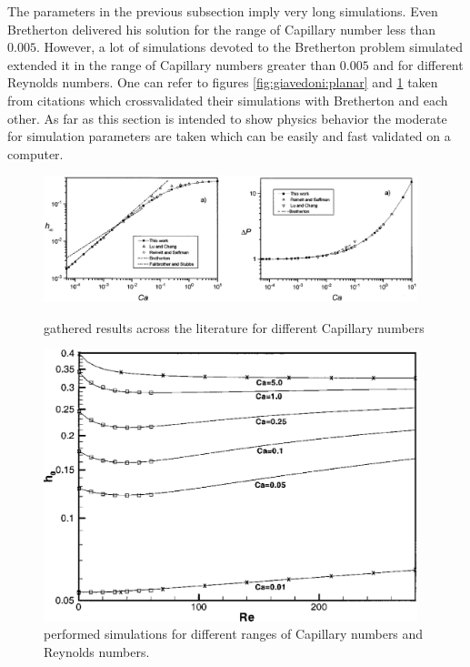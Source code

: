 \documentclass{article}
\begin{document}
The parameters in the previous subsection imply very long simulations. Even
Bretherton delivered his solution for the range of Capillary number less than
$0.005$. However, a lot of simulations devoted to the Bretherton problem
simulated extended it in the range of Capillary numbers greater than $0.005$
and for different Reynolds numbers. One can refer to figures
\ref{fig:giavedoni:planar} and \ref{fig:heil:planar} taken from citations
\cite{giavedoni-numerical,heil-bretherton} which crossvalidated their
simulations with Bretherton and each other. As far as this section is intended
to show physics behavior the moderate for simulation parameters are taken which
can be easily and fast validated on a computer. 
\begin{figure}
\includegraphics[width=0.97\textwidth]{Figures/giavedoni_planar.eps}
\caption{\citet{giavedoni-numerical} gathered results across the
literature for different Capillary numbers \label{fig:giavedoni:planar}}
\includegraphics[width=0.97\textwidth]{Figures/heil-planar.eps}
\caption{\citet{heil-bretherton} performed simulations for different ranges of
Capillary numbers and Reynolds numbers. \label{fig:heil:planar}}
\end{figure}
\end{document}
